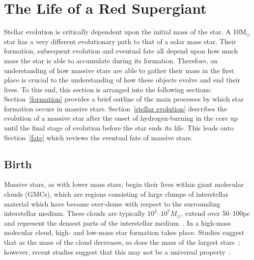 \section{The Life of a Red Supergiant} %
\label{sec:the_life_of_a_red_supergiant}

Stellar evolution is critically dependent upon the initial mass of the star.
A 10M$_{\odot}$ star has a very different evolutionary path to that of a solar mass star.
Their formation, subsequent evolution and eventual fate all depend upon how much mass the star is able to accumulate during its formation.
Therefore, an understanding of how massive stars are able to gather their mass in the first place is crucial to the understanding of how these objects evolve and end their lives.
To this end, this section is arranged into the following sections: Section~\ref{formation} provides a brief outline of the main processes by which star formation occurs in massive stars.
Section~\ref{stellar evolution} describes the evolution of a massive star after the onset of hydrogen-burning in the core up until the final stage of evolution before the star ends its life.
This leads onto Section~\ref{fate} which reviews the eventual fate of massive stars.

\subsection{Birth} %
\label{sub:birth}

Massive stars, as with lower mass stars, begin their lives within giant molecular clouds (GMCs), which are regions consisting of large clumps of interstellar material which have become over-dense with respect to the surrounding interstellar medium.
These clouds are typically $10^{4}$--$10^{7}M_{\odot}$, extend over 50--100pc and represent the densest parts of the interstellar medium~\citep{Fukui10}.
In a high-mass molecular cloud, high- and low-mass star formation takes place.
Studies suggest that as the mass of the cloud decreases, so does the mass of the largest stars~\citep{Fukui10,Weidner10}; however, recent studies suggest that this may not be a universal property~\citep[e.g.][]{Bressert12}.

